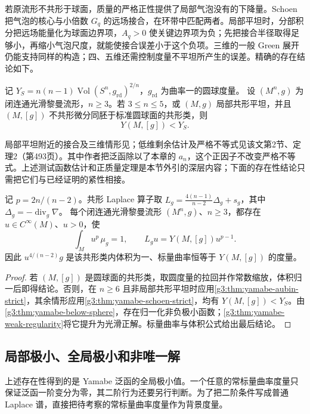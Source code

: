 \ProseParagraphBreak
若原流形不共形于球面，质量的严格正性提供了局部气泡没有的下降量。Schoen 把气泡的核心与小倍数 \(G_q\) 的远场接合，在环带中匹配两者。局部平坦时，分部积分把远场能量化为球面边界项，\(A_q>0\) 使关键边界项为负；先把接合半径取得足够小，再缩小气泡尺度，就能使接合误差小于这个负项。三维的一般 Green 展开仍能支持同样的构造；四、五维还需控制度量不平坦所产生的误差。精确的存在结论如下。

\begin{theorem}\label{g3:thm:yamabe-schoen-strict}
	记 \(Y_S=n(n-1)\operatorname{Vol}(S^n,g_{\mathrm{rd}})^{2/n}\)，\(g_{\mathrm{rd}}\) 为曲率一的圆球度量。
	设 \((M^n,g)\) 为闭连通光滑黎曼流形，\(n\ge3\)。若 \(3\le n\le5\)，或 \((M,g)\) 局部共形平坦，并且 \((M,[g])\) 不共形微分同胚于标准圆球面的共形类，则
	\[
		Y(M,[g])<Y_S.
	\]
\end{theorem}
局部平坦附近的接合及三维情形见\cite[第1节，定理1、命题1，第481--484页]{Schoen1984Yamabe}；低维剩余估计及严格不等式见该文第2节、定理2（第493页）。其中作者把泛函除以了本章的 \(a_n\)，这个正因子不改变严格不等式。上述测试函数估计和正质量定理是本节外引的深层内容；下面的存在性结论只需把它们与已经证明的紧性相接。

\begin{corollary}\label{g3:cor:yamabe-general-existence}
	记 \(p=2n/(n-2)\)。共形 Laplace 算子取 \(L_g=\tfrac{4(n-1)}{n-2}\Delta_g+s_g\)，其中 \(\Delta_g=-\operatorname{div}_g\nabla\)。
	每个闭连通光滑黎曼流形 \((M^n,g)\)、\(n\ge3\)，都存在 \(u\in C^\infty(M)\)、\(u>0\)，使
	\[
		\int_Mu^p\,\mu_g=1,
		\qquad L_gu=Y(M,[g])u^{p-1}.
	\]
	因此 \(u^{4/(n-2)}g\) 是该共形类内体积为一、标量曲率恒等于 \(Y(M,[g])\) 的度量。
\end{corollary}
\begin{proof}
	若 \((M,[g])\) 是圆球面的共形类，取圆度量的拉回并作常数缩放，体积归一后即得结论。否则，在 \(n\ge6\) 且非局部共形平坦时应用\cref{g3:thm:yamabe-aubin-strict}，其余情形应用\cref{g3:thm:yamabe-schoen-strict}，均有 \(Y(M,[g])<Y_S\)。由\cref{g3:thm:yamabe-below-sphere}，存在归一化非负极小函数；\cref{g3:thm:yamabe-weak-regularity}将它提升为光滑正解。标量曲率与体积公式给出最后结论。
\end{proof}

\subsection{局部极小、全局极小和非唯一解}
\label{g3:subsec:2405:04}
上述存在性得到的是 Yamabe 泛函的全局极小值。一个任意的常标量曲率度量只保证泛函一阶变分为零，其二阶行为还要另行判断。为了把二阶条件写成普通 Laplace 谱，直接把待考察的常标量曲率度量作为背景度量。

